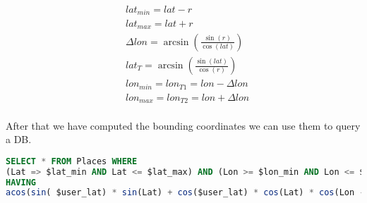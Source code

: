 \begin{eqnarray}
&lat_{min} = lat - r  \\
&lat_{max} = lat + r  \\
&\Delta lon = \arcsin(\frac{\sin(r)}{\cos(lat)})\\
&lat_T = \arcsin(  \frac{\sin(lat)} {\cos(r) }  )\\
&lon_{min} = lon_{T1} = lon - \Delta lon  \\
&lon_{max} = lon_{T2} = lon + \Delta lon 
\end{eqnarray}
\\
\noindent After that we have computed the bounding coordinates we can use them to query a DB.\\
\begin{lstlisting}[language=SQL]
SELECT * FROM Places WHERE
(Lat => $lat_min AND Lat <= $lat_max) AND (Lon >= $lon_min AND Lon <= $lon_max )
HAVING
acos(sin( $user_lat) * sin(Lat) + cos($user_lat) * cos(Lat) * cos(Lon - ($user_lon))) <= r;
\end{lstlisting}